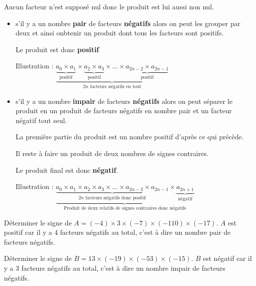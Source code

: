 \begin{preuve}
  Aucun facteur n'est supposé nul donc le produit est lui aussi non nul.
  \begin{itemize}
    \item s'il y a un nombre {\bf pair} de facteurs {\bf négatifs} alors on peut les grouper par deux 
    et ainsi onbtenir un produit dont tous les facteurs sont positifs.



    Le produit est donc \textbf{positif}   
    
    Illustration :
    $\underbrace{\underbrace{a_0\times a_1}_\textrm{positif}\times \underbrace{a_2\times a_3}_\textrm{positif} \times \ldots \times \underbrace{a_{2n-2}\times a_{2n-1}}_\textrm{positif}}_\textrm{$2n$ facteurs négatifs en tout}$

    \item s'il y a un nombre {\bf impair} de facteurs {\bf négatifs} alors on peut séparer le produit en
    un produit de facteurs négatifs en nombre pair et un facteur négatif tout seul. 
    
    La première partie du produit est un nombre positif d'après ce qui précède.

    Il reste à faire un produit de deux nombres de signes contraires.

    Le produit final est donc {\bf négatif}.

    Illustration :
    $\underbrace{\underbrace{a_0\times a_1\times a_2\times a_3\times \ldots \times a_{2n-2}\times a_{2n-1}}_\textrm{$2n$ facteurs négatifs donc positif} \times \underbrace{a_{2n+1}}_\textrm{négatif}}_\textrm{Produit de deux relatifs de signes contraires donc négatifs}$
  \end{itemize}
\end{preuve}

\begin{exemple*1}
  Déterminer le signe de $A=(-4)\times3\times(-7)\times(-110)\times(-17)$.
  \correction
  $A$ est positif car il y a 4 facteurs négatifs au total, c'est à dire un nombre pair de facteurs négatifs.
\end{exemple*1}

\begin{exemple*1}
  Déterminer le signe de $B=13\times(-19)\times(-53)\times(-15)$.
  \correction
  $B$ est négatif car il y a 3 facteurs négatifs au total, c'est à dire un nombre impair de facteurs négatifs.
\end{exemple*1}